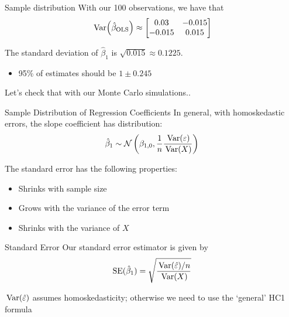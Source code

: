 \documentclass[aspectratio=169,t,11pt,table]{beamer}
\begin{document}
\begin{frame}{Sample distribution}
  With our 100 observations, we have that
  $$
    \var{\hat{\beta}_{\text{OLS}}} \approx
    \begin{bmatrix}
      0.03 & -0.015 \\
      -0.015 & 0.015
    \end{bmatrix}
  $$

  \bigskip
  The standard deviation of $\hat{\beta}_1$ is $\sqrt{0.015} \approx 0.1225$.
  \begin{itemize}
    \item 95\% of estimates should be $1 \pm 0.245$
  \end{itemize}

  \bigskip
  Let's check that with our Monte Carlo simulations..
\end{frame}



\begin{frame}{Sample Distribution of Regression Coefficients}
  In general, with homoskedastic errors, the slope coefficient has distribution:
  $$
    \hat{\beta}_1 \sim 
    \mathcal{N}\left( 
      \beta_{1, 0}, \frac{1}{n} \frac{\var{\varepsilon}}{\var{X}} 
    \right)
  $$

  \bigskip
  The standard error has the following properties:
  \begin{itemize}
    \item Shrinks with sample size
    
    \item Grows with the variance of the error term
    
    \item Shrinks with the variance of $X$
  \end{itemize}
\end{frame}

\begin{frame}{Standard Error}
  Our \alert{standard error} estimator is given by
  $$
    \text{SE}(\hat{\beta}_1) = \sqrt{ \frac{ \var{\hat{\varepsilon}} / n }{\var{X}} }
  $$

  \bigskip
  $\var{\hat{\varepsilon}}$ assumes homoskedasticity; otherwise we need to use the `general' HC1 formula
\end{frame}
\end{document}

